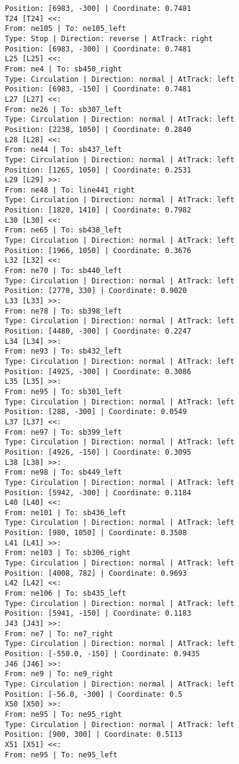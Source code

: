 \begin{lstlisting}[language = {}, tabsize=4, basicstyle=\footnotesize\ttfamily, showspaces=false, showstringspaces=false, caption = Signalling.RNA, label = {lst:EJ3_6}]
Position: [6983, -300] | Coordinate: 0.7481
T24 [T24] <<:
From: ne105 | To: ne105_left
Type: Stop | Direction: reverse | AtTrack: right 
Position: [6983, -300] | Coordinate: 0.7481
L25 [L25] <<:
From: ne4 | To: sb450_right
Type: Circulation | Direction: normal | AtTrack: left 
Position: [6983, -150] | Coordinate: 0.7481
L27 [L27] <<:
From: ne26 | To: sb307_left
Type: Circulation | Direction: normal | AtTrack: left 
Position: [2238, 1050] | Coordinate: 0.2840
L28 [L28] <<:
From: ne44 | To: sb437_left
Type: Circulation | Direction: normal | AtTrack: left 
Position: [1265, 1050] | Coordinate: 0.2531
L29 [L29] >>:
From: ne48 | To: line441_right
Type: Circulation | Direction: normal | AtTrack: left 
Position: [1820, 1410] | Coordinate: 0.7982
L30 [L30] <<:
From: ne65 | To: sb438_left
Type: Circulation | Direction: normal | AtTrack: left 
Position: [1966, 1050] | Coordinate: 0.3676
L32 [L32] <<:
From: ne70 | To: sb440_left
Type: Circulation | Direction: normal | AtTrack: left 
Position: [2770, 330] | Coordinate: 0.9020
L33 [L33] >>:
From: ne78 | To: sb398_left
Type: Circulation | Direction: normal | AtTrack: left 
Position: [4480, -300] | Coordinate: 0.2247
L34 [L34] >>:
From: ne93 | To: sb432_left
Type: Circulation | Direction: normal | AtTrack: left 
Position: [4925, -300] | Coordinate: 0.3086
L35 [L35] >>:
From: ne95 | To: sb301_left
Type: Circulation | Direction: normal | AtTrack: left 
Position: [288, -300] | Coordinate: 0.0549
L37 [L37] <<:
From: ne97 | To: sb399_left
Type: Circulation | Direction: normal | AtTrack: left 
Position: [4926, -150] | Coordinate: 0.3095
L38 [L38] >>:
From: ne98 | To: sb449_left
Type: Circulation | Direction: normal | AtTrack: left 
Position: [5942, -300] | Coordinate: 0.1184
L40 [L40] <<:	
From: ne101 | To: sb436_left
Type: Circulation | Direction: normal | AtTrack: left 
Position: [980, 1050] | Coordinate: 0.3508
L41 [L41] >>:
From: ne103 | To: sb306_right
Type: Circulation | Direction: normal | AtTrack: left 
Position: [4008, 782] | Coordinate: 0.9693
L42 [L42] <<:
From: ne106 | To: sb435_left
Type: Circulation | Direction: normal | AtTrack: left 
Position: [5941, -150] | Coordinate: 0.1183
J43 [J43] >>:
From: ne7 | To: ne7_right
Type: Circulation | Direction: normal | AtTrack: left 
Position: [-550.0, -150] | Coordinate: 0.9435
J46 [J46] >>:
From: ne9 | To: ne9_right
Type: Circulation | Direction: normal | AtTrack: left 
Position: [-56.0, -300] | Coordinate: 0.5
X50 [X50] >>:
From: ne95 | To: ne95_right
Type: Circulation | Direction: normal | AtTrack: left 
Position: [900, 300] | Coordinate: 0.5113
X51 [X51] <<:
From: ne95 | To: ne95_left

\end{lstlisting}
